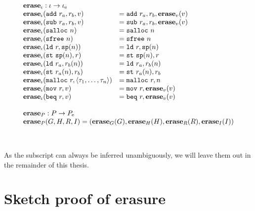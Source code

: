 {\[\begin{array}{l}
\begin{array}{ll}
\rlap{$\erase_{\iota} : \high\iota -> \simple{\iota}$} \\
\erase_{\iota}(\mathtt{add}\ r_a, r_b, \high v) &= \mathtt{add}\ r_a, r_b, \erase_v(\high v) \\
\erase_{\iota}(\mathtt{sub}\ r_a, r_b, \high v) &= \mathtt{sub}\ r_a, r_b, \erase_v(\high v) \\
\erase_{\iota}(\mathtt{salloc}\ n) &= \mathtt{salloc}\ n \\
\erase_{\iota}(\mathtt{sfree}\ n) &= \mathtt{sfree}\ n \\
\erase_{\iota}(\mathtt{ld}\ r, \mathtt{sp}(n)) &= \mathtt{ld}\ r, \mathtt{sp}(n) \\
\erase_{\iota}(\mathtt{st}\ \mathtt{sp}(n), r) &= \mathtt{st}\ \mathtt{sp}(n), r \\
\erase_{\iota}(\mathtt{ld}\ r_a, r_b(n)) &= \mathtt{ld}\ r_a, r_b(n) \\
\erase_{\iota}(\mathtt{st}\ r_a(n), r_b) &= \mathtt{st}\ r_a(n), r_b \\
\erase_{\iota}(\mathtt{malloc}\ r, \langle \tau_1, \dots, \tau_n \rangle) &= \mathtt{malloc}\ r, n \\
\erase_{\iota}(\mathtt{mov}\ r, \high v) &= \mathtt{mov}\ r, \erase_v(\high v) \\
\erase_{\iota}(\mathtt{beq}\ r, \high v) &= \mathtt{beq}\ r, \erase_v(\high v) \\
\end{array} \\\\

\begin{array}{l}
\erase_P : \high P -> \simple{P} \\
\erase_P(\high G, \high H, \high R, \high I) = (\erase_G(\high G), \erase_H(\high H), \erase_R(\high R), \erase_I(\high I)) \\\\
\end{array} \\\\

\end{array}\]
}

As the subscript can always be inferred unambiguously, we will leave them
out in the remainder of this thesis.

\section{Sketch proof of erasure}

